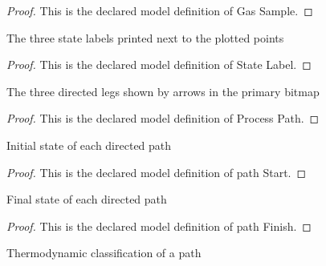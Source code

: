 \begin{proof}
  This is the declared model definition of Gas Sample.
\end{proof}
\begin{definition}
  \label{def:physics:phyx-mini-0415:phyxminiproblems-problemphyxmini0415-statelabel}
  The three state labels printed next to the plotted points
\end{definition}
\begin{proof}
  This is the declared model definition of State Label.
\end{proof}
\begin{definition}
  \label{def:physics:phyx-mini-0415:phyxminiproblems-problemphyxmini0415-processpath}
  The three directed legs shown by arrows in the primary bitmap
\end{definition}
\begin{proof}
  This is the declared model definition of Process Path.
\end{proof}
\begin{definition}
  \label{def:physics:phyx-mini-0415:phyxminiproblems-problemphyxmini0415-pathstart}
  Initial state of each directed path
\end{definition}
\begin{proof}
  This is the declared model definition of path Start.
\end{proof}
\begin{definition}
  \label{def:physics:phyx-mini-0415:phyxminiproblems-problemphyxmini0415-pathfinish}
  Final state of each directed path
\end{definition}
\begin{proof}
  This is the declared model definition of path Finish.
\end{proof}
\begin{definition}
  \label{def:physics:phyx-mini-0415:phyxminiproblems-problemphyxmini0415-processkind}
  Thermodynamic classification of a path
\end{definition}
